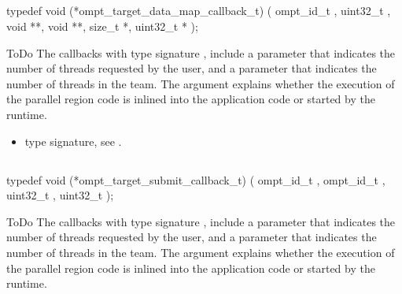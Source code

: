 \subsection{}
\label{subsec:ompt_target_data_map_callback_t}
\format
\begin{boxedcode}
typedef void (*ompt\_target\_data\_map\_callback\_t) (
  ompt\_id\_t ,
  uint32\_t ,
  void **,
  void **,
  size\_t *,
  uint32\_t *
);
\end{boxedcode}
\descr ToDo
The callbacks with type signature ,
include a parameter 
that indicates the number of threads requested by the user, and a parameter
 that indicates the number of threads in the team.
The  argument explains whether the execution of the parallel
region code is inlined into the application code or started by the runtime.

\crossreferences
\begin{itemize}
\item {} type signature, see
.
\end{itemize}



\subsection{}
\label{subsec:ompt_target_submit_callback_t}
\format
\begin{boxedcode}
typedef void (*ompt\_target\_submit\_callback\_t) (
  ompt\_id\_t ,
  ompt\_id\_t ,
  uint32\_t ,
  uint32\_t 
);
\end{boxedcode}
\descr ToDo
The callbacks with type signature ,
include a parameter 
that indicates the number of threads requested by the user, and a parameter
 that indicates the number of threads in the team.
The  argument explains whether the execution of the parallel
region code is inlined into the application code or started by the runtime.

